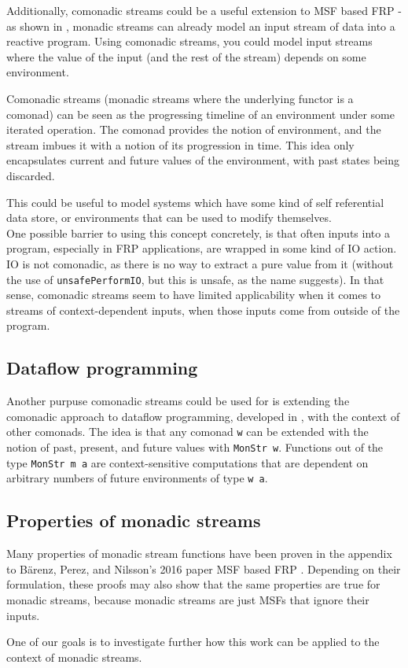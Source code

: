 Additionally, comonadic streams could be a useful extension to MSF based FRP - as shown in \cite{frp_refactored}, monadic streams can already model an input stream of data into a reactive program. Using comonadic streams, you could model input streams where the value of the input (and the rest of the stream) depends on some environment. 

Comonadic streams (monadic streams where the underlying functor is a comonad) can be seen as the progressing timeline of an environment under some iterated operation. The comonad provides the notion of environment, and the stream imbues it with a notion of its progression in time. This idea only encapsulates current and future values of the environment, with past states being discarded.

This could be useful to model systems which have some kind of self referential data store, or environments that can be used to modify themselves. \\

One possible barrier to using this concept concretely, is that often inputs into a program, especially in FRP applications, are wrapped in some kind of IO action. IO is not comonadic, as there is no way to extract a pure value from it (without the use of \verb+unsafePerformIO+, but this is unsafe, as the name suggests). In that sense, comonadic streams seem to have limited applicability when it comes to streams of context-dependent inputs, when those inputs come from outside of the program.


\subsection{Dataflow programming}

Another purpuse comonadic streams could be used for is extending the comonadic approach to dataflow programming, developed in \cite{essence_of_dataflow}, with the context of other comonads. The idea is that any comonad \verb+w+ can be extended with the notion of past, present, and future values with \verb+MonStr w+. Functions out of the type \verb+MonStr m a+ are context-sensitive computations that are dependent on arbitrary numbers of future environments of type \verb+w a+.

\subsection{Properties of monadic streams}

Many properties of monadic stream functions have been proven in the appendix \cite{msf_properties} to Bärenz, Perez, and Nilsson's 2016 paper MSF based FRP \cite{frp_refactored}. Depending on their formulation, these proofs may also show that the same properties are true for monadic streams, because monadic streams are just MSFs that ignore their inputs. 

One of our goals is to investigate further how this work can be applied to the context of monadic streams.
